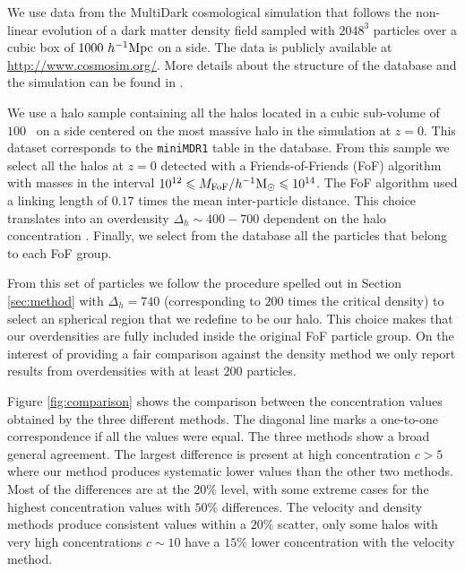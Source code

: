 \documentclass[a4,useAMS,usenatbib,usegraphicx]{mn2e}
\newcommand{\hMpc}{{\ifmmode{h^{-1}{\rm Mpc}}\else{$h^{-1}$Mpc}\fi}}
\newcommand{\hMsun}{{\ifmmode{h^{-1}{\rm {M_{\odot}}}}\else{$h^{-1}{\rm{M_{\odot}}}$}\fi}}
\begin{document}
We use data from the MultiDark cosmological simulation that follows
the non-linear evolution of a dark matter density field sampled with
$2048^3$ particles over a cubic box of $1000\ \hMpc$ on a side.  
The data is publicly available at \url{http://www.cosmosim.org/}.
More details about the structure of the database and the simulation
can be found in \citep{2013AN....334..691R}.


We use a halo sample containing all the halos located in a cubic
sub-volume of $100$ \hMpc\ on a side centered on the most massive halo
in the simulation at $z=0$.
This dataset corresponds to the \texttt{miniMDR1}
table in the  database.  
From this sample we select all the halos at $z=0$ detected
with a Friends-of-Friends (FoF) algorithm with masses in the interval
$10^{12}\leq M_{\rm FoF}/\hMsun \leq 10^{14}$.  
The FoF algorithm used a linking length of $0.17$ times the mean
inter-particle distance. This choice translates into an overdensity
$\Delta_h\sim  400-700$ dependent on the halo concentration \citep{More2011}.
Finally, we select from the database all the particles that belong to
each FoF group.

From this set of particles we follow the procedure spelled out in
Section \ref{sec:method} with $\Delta_h=740$ (corresponding to $200$
times the critical density) to select an spherical region that we
redefine to be our halo.  
This choice makes that our overdensities are fully included inside the
original FoF particle group.   
On the interest of providing a fair comparison against the density method we
only report results from overdensities with at least $200$ particles. 

Figure \ref{fig:comparison} shows the comparison between the
concentration values obtained by the three different methods. 
The diagonal line marks a one-to-one correspondence if all the values
were equal.
The three methods show a broad general agreement. 
The largest difference is present at high concentration $c>5$ where
our method produces systematic lower values than the other two
methods. Most of the differences are at the $20\%$ level, with some
extreme cases for the highest concentration values with $50\%$
differences.  The velocity and density methods produce consistent
values within a $20\%$ scatter, only some halos with very high
concentrations $c\sim 10$ have a $15\%$ lower concentration with the
velocity method. 
\end{document}
